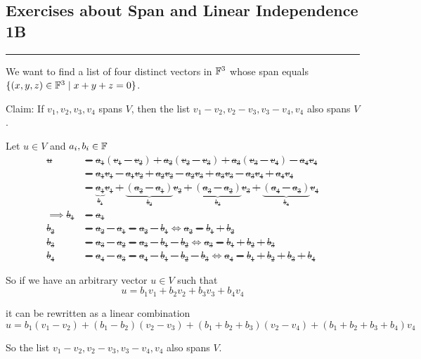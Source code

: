 \subsection*{Exercises about Span and Linear Independence 1B}
\hrule
\phantom{.}

\begin{xrcs}
  We want to find a list of four distinct vectors in $\mathbb{F}^3$ whose span equals $\{(x,y,z) \in \mathbb{F}^3 \mid x + y + z = 0 \}$.
\end{xrcs}

\begin{xrcs}
  Claim: If $v_1, v_2, v_3, v_4$ spans $V$, then the list $v_1 - v_2, v_2 -v_3, v_3 -v_4, v_4$ also spans $V$.
\end{xrcs}
\begin{prf}
  Let $u \in V$ and $a_i, b_i \in \mathbb{F}$ \st
  \[
    \begin{aligned}
      u
      &= a_1 (v_1 -v_2) + a_2 (v_2-v_3) + a_3 (v_3-v_4)-a_4 v_4 \\
      &= a_1 v_1 - a_1 v_2 + a_2v_2 - a_2 v_3 + a_3 v_3 - a_3 v_4 + a_4 v_4 \\
      &= \underbrace{a_1}_{b_1} v_1 + \underbrace{(a_2 -a_1)}_{b_2} v_2 + \underbrace{(a_3 -a_2)}_{b_3} v_3 + \underbrace{(a_4 -a_3)}_{b_4} v_4 \\
      \implies b_1 & = a_1 \\
      b_2 &= a_2 -a_1 = a_2 - b_1 \iff a_2 = b_1 + b_2 \\
      b_3 &= a_3 - a_2 = a_3 - b_1 -b_2 \iff a_3 = b_1 + b_2 + b_3 \\
      b_4 &= a_4 - a_3 = a_4 - b_1 - b_2 - b_3 \iff a_4 = b_1 + b_2 + b_3 + b_4
    \end{aligned}
  \]

  So if we have an arbitrary vector $u \in V$ such that
  \[
    u = b_1 v_1 +  b_2 v_2 + b_3 v_3 + b_4 v_4
  \]

  it can be rewritten as a linear combination
  \[
    u = b_1 (v_1 - v_2) + (b_1-b_2)(v_2-v_3) + (b_1+b_2+b_3)(v_2-v_4)+(b_1+b_2+b_3+b_4)v_4
  \]

  So the list $v_1 - v_2, v_2 -v_3, v_3 -v_4, v_4$ also spans $V$.
\end{prf}

